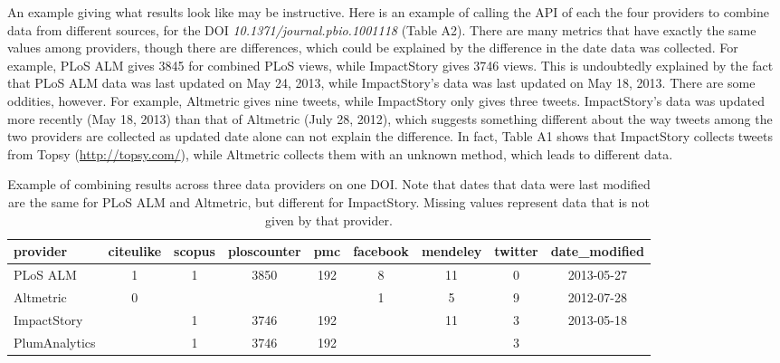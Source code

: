 \documentclass[letterpaper,superscriptaddress,showkeys,longbibliography]{revtex4-1}\usepackage{graphicx, color}
\begin{document}
An example giving what results look like may be instructive. Here is an example of calling the API of each the four providers to combine data from different sources, for the DOI \emph{10.1371/journal.pbio.1001118} \cite{arslan2011} (Table A2). There are many metrics that have exactly the same values among providers, though there are differences, which could be explained by the difference in the date data was collected. For example, PLoS ALM gives 3845 for combined PLoS views, while ImpactStory gives 3746 views. This is undoubtedly explained by the fact that PLoS ALM data was last updated on May 24, 2013, while ImpactStory's data was last updated on May 18, 2013. There are some oddities, however. For example, Altmetric gives nine tweets, while ImpactStory only gives three tweets. ImpactStory's data was updated more recently (May 18, 2013) than that of Altmetric (July 28, 2012), which suggests something different about the way tweets among the two providers are collected as updated date alone can not explain the difference. In fact, Table A1 shows that ImpactStory collects tweets from Topsy (\url{http://topsy.com/}), while Altmetric collects them with an unknown method, which leads to different data.

\begin{table}[ht]
\centering
\caption{Example of combining results across three data providers on one DOI. Note that dates that data were last modified are the same for PLoS ALM and Altmetric, but different for ImpactStory. Missing values represent data that is not given by that provider.} 
\begin{tabular}{l|cccccccc}
  \hline
provider & citeulike & scopus & ploscounter & pmc & facebook & mendeley & twitter & date\_modified \\ 
  \hline
PLoS ALM & 1 & 1 & 3850 & 192 & 8 & 11 & 0 & 2013-05-27 \\ 
  Altmetric & 0 &  &  &  & 1 & 5 & 9 & 2012-07-28 \\ 
  ImpactStory &  & 1 & 3746 & 192 &  & 11 & 3 & 2013-05-18 \\ 
  PlumAnalytics &  & 1 & 3746 & 192 &  &  & 3 &  \\ 
   \hline
\end{tabular}
\end{table}



\end{document}
